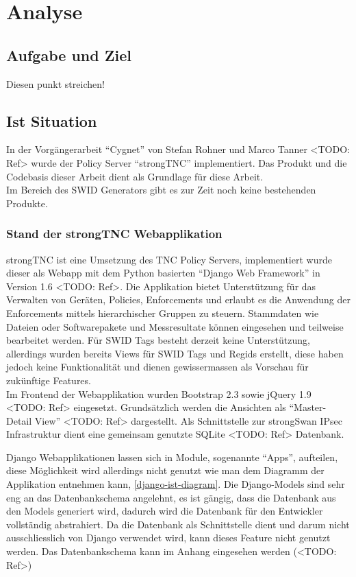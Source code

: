 \chapter{Analyse}

\section{Aufgabe und Ziel}
Diesen punkt streichen!

\section{Ist Situation}
In der Vorgängerarbeit \enquote{Cygnet} von Stefan Rohner und Marco Tanner
<TODO: Ref> wurde der Policy Server \enquote{strongTNC} implementiert. Das
Produkt und die Codebasis dieser Arbeit dient als Grundlage für diese Arbeit.\\
Im Bereich des SWID Generators gibt es zur Zeit noch keine bestehenden Produkte.

\subsection{Stand der strongTNC Webapplikation} 
strongTNC ist eine Umsetzung des TNC Policy Servers, implementiert wurde dieser
als Webapp mit dem Python basierten \enquote{Django Web Framework} in Version 1.6 <TODO: Ref>.
Die Applikation bietet Unterstützung für das Verwalten von Geräten, Policies,
Enforcements und erlaubt es die Anwendung der Enforcements mittels
hierarchischer Gruppen zu steuern. Stammdaten wie Dateien oder Softwarepakete
und Messresultate können eingesehen und teilweise bearbeitet werden. Für SWID
Tags besteht derzeit keine Unterstützung, allerdings wurden bereits Views für
SWID Tags und Regids erstellt, diese haben jedoch keine Funktionalität und
dienen gewissermassen als Vorschau für zukünftige Features. \\
Im Frontend der Webapplikation wurden Bootstrap 2.3 sowie jQuery 1.9 <TODO:
Ref> eingesetzt. Grundsätzlich werden die Ansichten als \enquote{Master-Detail
View} <TODO: Ref> dargestellt.
Als Schnittstelle zur strongSwan IPsec Infrastruktur dient eine gemeinsam
genutzte SQLite <TODO: Ref> Datenbank. 

Django Webapplikationen lassen sich in Module, sogenannte \enquote{Apps},
aufteilen, diese Möglichkeit wird allerdings nicht genutzt wie man dem
Diagramm der Applikation entnehmen kann, \autoref{django-ist-diagram}. Die
Django-Models sind sehr eng an das Datenbankschema angelehnt, es ist gängig,
dass die Datenbank aus den Models generiert wird, dadurch wird die Datenbank für
den Entwickler vollständig abstrahiert. Da die Datenbank als Schnittstelle dient
und darum nicht ausschliesslich von Django verwendet wird, kann dieses Feature
nicht genutzt werden. Das Datenbankschema kann im Anhang eingesehen werden
(<TODO: Ref>)

